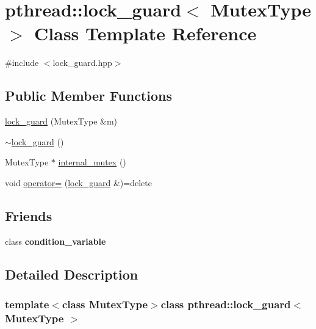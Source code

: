 \hypertarget{classpthread_1_1lock__guard}{\section{pthread\+:\+:lock\+\_\+guard$<$ Mutex\+Type $>$ Class Template Reference}
\label{classpthread_1_1lock__guard}
}


{\ttfamily \#include $<$lock\+\_\+guard.\+hpp$>$}

\subsection*{Public Member Functions}
\begin{DoxyCompactItemize}
\item 
\hyperlink{classpthread_1_1lock__guard_a5298f98a23bc7d7fe4fc9636f989ad65}{lock\+\_\+guard} (Mutex\+Type \&m)
\item 
\hyperlink{classpthread_1_1lock__guard_a958884251adfb8d5f9bd7d643cc3949f}{$\sim$lock\+\_\+guard} ()
\item 
Mutex\+Type $\ast$ \hyperlink{classpthread_1_1lock__guard_a0aeeee216e7b322845678cf59990351b}{internal\+\_\+mutex} ()
\item 
void \hyperlink{classpthread_1_1lock__guard_a1f9ab705f7ffe9eb8739ff3cf34cf7f2}{operator=} (\hyperlink{classpthread_1_1lock__guard}{lock\+\_\+guard} \&)=delete
\end{DoxyCompactItemize}
\subsection*{Friends}
\begin{DoxyCompactItemize}
\item 
\hypertarget{classpthread_1_1lock__guard_a89c9b6aa2256fa5efd92a333d96381d4}{class {\bfseries condition\+\_\+variable}}\label{classpthread_1_1lock__guard_a89c9b6aa2256fa5efd92a333d96381d4}

\end{DoxyCompactItemize}


\subsection{Detailed Description}
\subsubsection*{template$<$class Mutex\+Type$>$class pthread\+::lock\+\_\+guard$<$ Mutex\+Type $>$}

